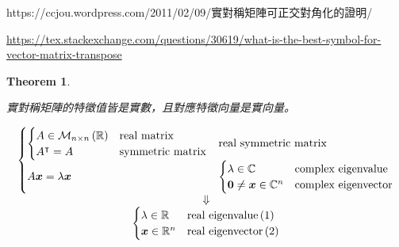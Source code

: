 \documentclass[
]{book}
\newtheorem{theorem}{Theorem}[chapter]
\theoremstyle{definition}
\theoremstyle{definition}
\theoremstyle{definition}
\theoremstyle{definition}
\theoremstyle{remark}
\begin{document}
\begin{CJK}{UTF8}{bsmi}
https://ccjou.wordpress.com/2011/02/09/實對稱矩陣可正交對角化的證明/
\end{CJK}

\url{https://tex.stackexchange.com/questions/30619/what-is-the-best-symbol-for-vector-matrix-transpose}

\begin{theorem}
\protect\hypertarget{thm:real-sym-real-eigen}{}\label{thm:real-sym-real-eigen}\leavevmode

\begin{CJK}{UTF8}{bsmi}
實對稱矩陣的特徵值皆是實數，且對應特徵向量是實向量。
\end{CJK}

\[
\begin{array}{c}
\begin{cases}
\begin{cases}
A\in\mathcal{M}_{n\times n}\left(\mathbb{R}\right) & \textup{real matrix}\\
A^{\intercal}=A & \textup{symmetric matrix}
\end{cases} & \textup{real symmetric matrix}\\
A\boldsymbol{x}=\lambda\boldsymbol{x} & \begin{cases}
\lambda\in\mathbb{C} & \textup{complex eigenvalue}\\
\boldsymbol{0}\ne\boldsymbol{x}\in\mathbb{C}^{n} & \textup{complex eigenvector}
\end{cases}
\end{cases}\\
\Downarrow\\
\begin{cases}
\lambda\in\mathbb{R} & \textup{real eigenvalue}\left(1\right)\\
\boldsymbol{x}\in\mathbb{R}^{n} & \textup{real eigenvector}\left(2\right)
\end{cases}
\end{array}
\]

\end{theorem}
\end{document}
